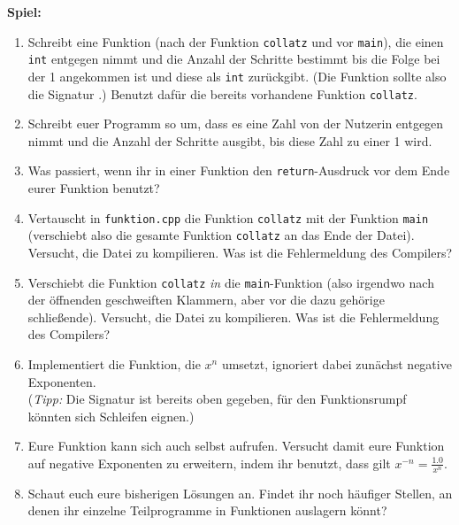 \textbf{Spiel:}
\begin{enumerate}
	\item Schreibt eine Funktion (nach der Funktion \texttt{collatz} und vor \texttt{main}), die einen \texttt{int} entgegen nimmt und die Anzahl der Schritte bestimmt bis die Folge bei der 1 angekommen ist und diese als \texttt{int} zurückgibt.
	(Die Funktion sollte also die Signatur .)
	    Benutzt dafür die bereits vorhandene Funktion \texttt{collatz}.
	\item Schreibt euer Programm so um, dass es eine Zahl von der Nutzerin entgegen nimmt und die Anzahl der Schritte ausgibt, bis diese Zahl zu einer 1 wird.
    \item Was passiert, wenn ihr in einer Funktion den \texttt{return}-Ausdruck vor dem Ende eurer Funktion benutzt?
    \item Vertauscht in \texttt{funktion.cpp} die Funktion \texttt{collatz} mit der Funktion \texttt{main} (verschiebt also die gesamte Funktion \texttt{collatz} an das Ende der Datei).
        Versucht, die Datei zu kompilieren.
        Was ist die Fehlermeldung des Compilers?
    \item Verschiebt die Funktion \texttt{collatz} \emph{in} die \texttt{main}-Funktion (also irgendwo nach der öffnenden geschweiften Klammern, aber vor die dazu gehörige schließende).
        Versucht, die Datei zu kompilieren. Was ist die Fehlermeldung des Compilers?
    \item Implementiert die Funktion, die $x^n$ umsetzt, ignoriert dabei zunächst negative Exponenten. \\
        (\emph{Tipp:} Die Signatur ist bereits oben gegeben, für den Funktionsrumpf könnten sich Schleifen eignen.)
    \item Eure Funktion kann sich auch selbst aufrufen. Versucht damit eure Funktion auf negative Exponenten zu erweitern, indem ihr benutzt, dass gilt $x^{-n} = \frac{1.0}{x^n}$.
    \item Schaut euch eure bisherigen Lösungen an.
        Findet ihr noch häufiger Stellen, an denen ihr einzelne Teilprogramme in Funktionen auslagern könnt?
\end{enumerate}
